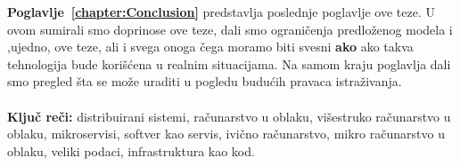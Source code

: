 \textbf{Poglavlje~\ref{chapter:Conclusion}} predstavlja poslednje poglavlje ove teze. U ovom sumirali smo doprinose ove teze, dali smo ograni\v cenja predlo\v zenog modela i ,ujedno, ove teze, ali i svega onoga \v cega moramo biti svesni \textbf{ako} ako takva tehnologija bude kori\v s\'cena u realnim situacijama. Na samom kraju poglavlja dali smo pregled \v sta se mo\v ze uraditi u pogledu budu\'cih pravaca istra\v zivanja.\\\\

\noindent
\textbf{Klju\v c re\v ci:} distribuirani sistemi, ra\v cunarstvo u oblaku, vi\v sestruko ra\v cunarstvo u oblaku, mikroservisi, softver kao servis, ivi\v cno ra\v cunarstvo, mikro ra\v cunarstvo u oblaku, veliki podaci, infrastruktura kao kod.